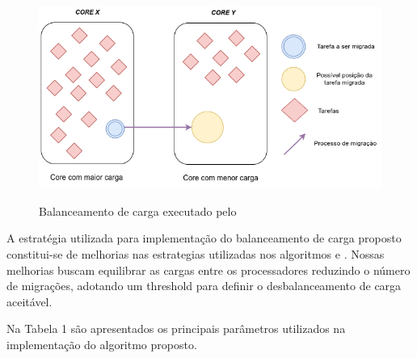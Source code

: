 \begin{figure}[!htb]
	\centering
	\caption{Balanceamento de carga executado pelo \newlb}
	\centering
	\includegraphics[scale=0.40]{figuras/smartlb_load_balance.png}
	\label{img_smartlb_effect}
	\centering
\end{figure}

A estratégia utilizada para implementação do balanceamento de carga proposto constitui-se de melhorias nas estrategias utilizadas nos algoritmos \greedylb e . Nossas melhorias buscam equilibrar as cargas entre os processadores reduzindo o número de migrações, adotando um threshold para definir o desbalanceamento de carga aceitável.

Na Tabela 1 são apresentados os principais parâmetros utilizados na implementação do
algoritmo proposto.

\begin{table}[h]
	\centering
	\caption{Principais parâmetros utilizados no algoritmo \newlb}
	\vspace{0.5cm}
	 \end{table}


